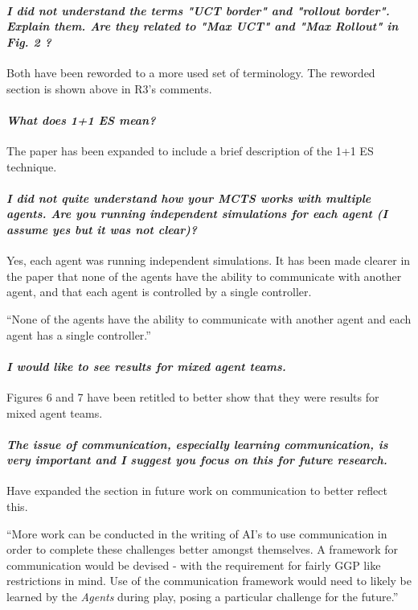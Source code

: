 \documentclass{article}
\begin{document}
\paragraph*{\textit{I did not understand the terms "UCT border" and "rollout border". Explain them. Are they related to "Max UCT" and "Max Rollout" in Fig. 2 ?}}
Both have been reworded to a more used set of terminology. The reworded section is shown above in R3's comments.
\paragraph*{\textit{What does 1+1 ES mean?}}
The paper has been expanded to include a brief description of the 1+1 ES technique.
\paragraph*{\textit{I did not quite understand how your MCTS works with multiple agents. Are you running independent simulations for each agent (I assume yes but it was not clear)? }}
Yes, each agent was running independent simulations. It has been made clearer in the paper that none of the agents have the ability to communicate with another agent, and that each agent is controlled by a single controller.

``None of the agents have the ability to communicate with another agent and each agent has a single controller.''
\paragraph*{\textit{I would like to see results for mixed agent teams.}}
Figures 6 and 7 have been retitled to better show that they were results for mixed agent teams.
\paragraph*{\textit{The issue of communication, especially learning communication, is very important and I suggest you focus on this for future research.}}
Have expanded the section in future work on communication to better reflect this.

``More work can be conducted in the writing of AI's to use communication in order to complete these challenges better amongst themselves. A framework for communication would be devised - with the requirement for fairly GGP like restrictions in mind. Use of the communication framework would need to likely be learned by the \emph{Agents} during play, posing a particular challenge for the future.''
\end{document}
